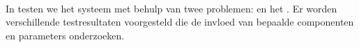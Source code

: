 \paragraph{}
In  testen we het systeem met behulp van twee problemen:  en het . Er worden verschillende testresultaten voorgesteld die de invloed van bepaalde componenten en parameters onderzoeken.




